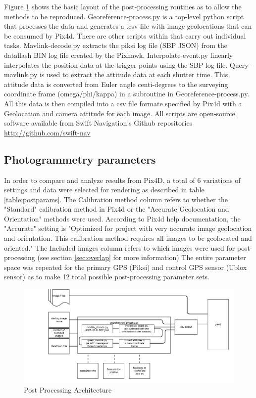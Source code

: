 \documentclass{article}
\begin{document}
Figure \ref{postprocess} shows the basic layout of the post-processing routines as to allow the methods to be reproduced.  Georeference-process.py is a top-level python script that processes the data and generates a .csv file with image geolocations that can be consumed by Pix4d. There are other scripts within that carry out individual tasks. Mavlink-decode.py extracts the piksi log file (SBP JSON) from the dataflash BIN log file created by the Pixhawk. Interpolate-event.py linearly interpolates the position data at the trigger points using the SBP log file. Query-mavlink.py is used to extract the attitude data at each shutter time. This attitude data is converted from Euler angle centi-degrees to the surveying coordinate frame (omega/phi/kappa) in a subroutine in Georeference-process.py. All this data is then compiled into a csv file formate specified by Pix4d with a Geolocation and camera attitude for each image.  All scripts are open-source software available from Swift Navigation's Github repositories \url{http://github.com/swift-nav}
\subsection{Photogrammetry parameters}
In order to compare and analyze results from Pix4D, a total of 6 variations of settings and data were selected for rendering as described in table \ref{table:postparams}.  The Calibration method column refers to whether the "Standard" calibration method in Pix4d or the "Accurate Geolocation and Orientation" methods were used.  According to Pix4d help documentation, the "Accurate" setting is "Optimized for project with very accurate image geolocation and orientation. This calibration method requires all images to be geolocated and oriented."\cite{pix4d_support1}  The Included images column refers to which images were used for post-processing (see section \ref{sec:overlap} for more information)
The entire parameter space was repeated for the primary GPS (Piksi) and control GPS sensor (Ublox sensor) as to make 12 total possible post-processing parameter sets.


\begin{figure}
\includegraphics[width=7in]{images/flow_charts/uav_survey_processing_architecture.png}
\caption{Post Processing Architecture}
\label{postprocess}
\end{figure}
\end{document}
